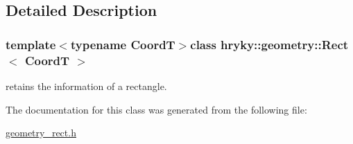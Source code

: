 \subsection{Detailed Description}
\subsubsection*{template$<$typename Coord\-T$>$class hryky\-::geometry\-::\-Rect$<$ Coord\-T $>$}

retains the information of a rectangle. 

The documentation for this class was generated from the following file\-:\begin{DoxyCompactItemize}
\item 
\hyperlink{geometry__rect_8h}{geometry\-\_\-rect.\-h}\end{DoxyCompactItemize}
